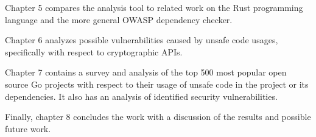 Chapter 5 compares the analysis tool to related work on the Rust programming language and the
more general OWASP dependency checker.

Chapter 6 analyzes possible vulnerabilities caused by unsafe code usages, specifically with
respect to cryptographic APIs.

Chapter 7 contains a survey and analysis of the top 500 most popular open source Go projects
with respect to their usage of unsafe code in the project or its dependencies. It also has an
analysis of identified security vulnerabilities.

Finally, chapter 8 concludes the work with a discussion of the results and possible future work.


